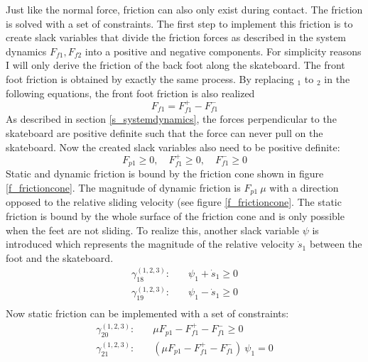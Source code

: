Just like the normal force, friction can also only exist during contact. The friction is solved with a set of constraints. The first step to implement this friction is to create slack variables that divide the friction forces as described in the system dynamics $F_{f1},F_{f2}$ into a positive and negative components. For simplicity reasons I will only derive the friction of the back foot along the skateboard. The front foot friction is obtained by exactly the same process. By replacing $_1$ to $_2$ in the following equations, the front foot friction is also realized
\begin{equation} \label{e_plusminfric}
   F_{f1} = F_{f1}^+ - F_{f1}^- 
\end{equation}
As described in section \ref{s_systemdynamics}, the forces perpendicular to the skateboard are positive definite such that the force can never pull on the skateboard. Now the created slack variables also need to be positive definite:
\begin{equation}
    F_{p1} \geq 0,\quad F_{f1}^+ \geq 0,\quad F_{f1}^- \geq 0  
\end{equation}
Static and dynamic friction is bound by the friction cone shown in figure \ref{f_frictioncone}. The magnitude of dynamic friction is $F_{p1}\ \mu$ with a direction opposed to the relative sliding velocity (see figure \ref{f_frictioncone}. The static friction is bound by the whole surface of the friction cone and is only possible when the feet are not sliding. To realize this, another slack variable $\psi$ is introduced which represents the magnitude of the relative velocity $\dot s_1$ between the foot and the skateboard. 
\begin{equation}
\begin{split}
    \gamma_{18}^{(1,2,3)}: \quad & \psi_1 + \dot s_1  \geq 0 \\
    \gamma_{19}^{(1,2,3)}: \quad & \psi_1 - \dot s_1  \geq 0 \\
\end{split}
\end{equation}
Now static friction can be implemented with a set of constraints:
\begin{equation}
\begin{split}\label{e_frictioncontrol}
       \gamma_{20}^{(1,2,3)}: \quad & \mu F_{p1} - F_{f1}^+ - F_{f1}^- \geq 0 \\
       \gamma_{21}^{(1,2,3)}: \quad & (\mu F_{p1} - F_{f1}^+ - F_{f1}^-)\ \psi_1  = 0
\end{split}
\end{equation}
